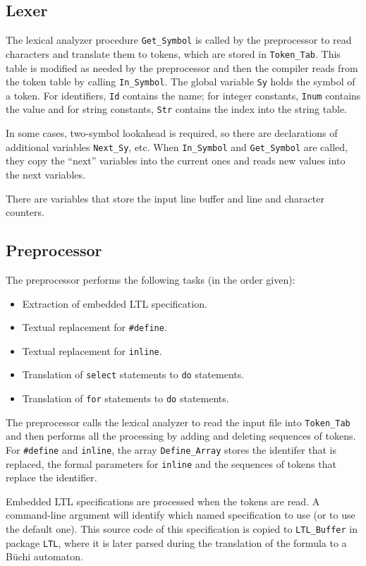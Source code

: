 \documentclass[11pt]{article}
\newcommand*{\p}[1]{\texttt{#1}}
\begin{document}
\subsection{Lexer}

The lexical analyzer procedure \p{Get\_Symbol} is called by the
preprocessor to read characters and translate them to tokens, which are
stored in \p{Token\_Tab}. This table is modified as needed by the
preprocessor and then the compiler reads from the token table by calling
\p{In\_Symbol}. The global variable \p{Sy} holds the symbol of a token.
For identifiers, \p{Id} contains the name; for integer constants,
\p{Inum} contains the value and for string constants, \p{Str} contains
the index into the string table.

In some cases, two-symbol lookahead is required, so there are
declarations of additional variables \p{Next\_Sy}, etc. When
\p{In\_Symbol} and \p{Get\_Symbol} are called, they copy the ``next''
variables into the current ones and reads new values into the next
variables.

There are variables that store the input line buffer and line and
character counters.

\subsection{Preprocessor}

The preprocessor performs the following tasks (in the order given):
\begin{itemize}
\item Extraction of embedded LTL specification.
\item Textual replacement for \p{\#define}.
\item Textual replacement for \p{inline}.
\item Translation of \p{select} statements to \p{do} statements.
\item Translation of \p{for} statements to \p{do} statements.
\end{itemize}

The preprocessor calls the lexical analyzer to read the input file into
\p{Token\_Tab} and then performs all the processing by adding and
deleting sequences of tokens. For \p{\#define} and \p{inline}, the array
\p{Define\_Array} stores the identifer that is replaced, the formal
parameters for \p{inline} and the sequences of tokens that replace the
identifier.

Embedded LTL specifications are processed when the tokens are read. A
command-line argument will identify which named specification to use (or
to use the default one). This source code of this specification is
copied to \p{LTL\_Buffer} in package \p{LTL}, where it is later parsed
during the translation of the formula to a B\"{u}chi automaton.
\end{document}
